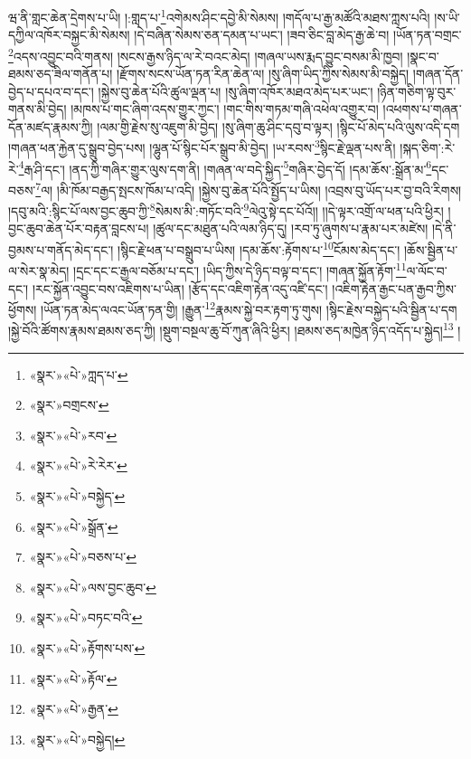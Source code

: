 ཝ་ནི་གླང་ཆེན་དྲེགས་པ་ཡི། །:གླད་པ་\footnote{«སྣར་»«པེ་»ཀླད་པ་}འགེམས་ཤིང་དབྱེ་མི་སེམས། །གདོལ་པ་རྒྱ་མཚོའི་མཐས་ཀླས་པའི། །ས་ཡི་དཀྱིལ་འཁོར་བསྐྱང་མི་སེམས། །དེ་བཞིན་སེམས་ཅན་དམན་པ་ཡང་། །ཟབ་ཅིང་བླ་མེད་རྒྱ་ཆེ་བ། །ཡོན་ཏན་བགྲང་\footnote{«སྣར་»བགྲངས་}འདས་འབྱུང་བའི་གནས། །སངས་རྒྱས་ཉིད་ལ་རེ་བའང་མེད། །གཞལ་ཡས་རྨད་བྱུང་བསམ་མི་ཁྱབ། །སྣང་བ་ཐམས་ཅད་ཟིལ་གནོན་པ། །རྫོགས་སངས་ཡོན་ཏན་རིན་ཆེན་ལ། །སུ་ཞིག་ཡིད་ཀྱིས་སེམས་མི་བསྐྱེད། །གཞན་དོན་བྱེད་པ་དཔའ་བ་དང་། །སྐྱེས་བུ་ཆེན་པོའི་ཚུལ་ལྡན་པ། །སུ་ཞིག་འཁོར་མཐའ་མེད་པར་ཡང་། །ཉིན་གཅིག་ལྟ་བུར་གནས་མི་བྱེད། །མཁས་པ་གང་ཞིག་འདས་གྱུར་ཀྱང་། །གང་གིས་གཏམ་གཞི་འཕེལ་འགྱུར་བ། །འཕགས་པ་གཞན་དོན་མཛད་རྣམས་ཀྱི། །ལམ་གྱི་རྗེས་སུ་འཇུག་མི་བྱེད། །སུ་ཞིག་ཆུ་ཤིང་དབུ་བ་ལྟར། །སྙིང་པོ་མེད་པའི་ལུས་འདི་དག །གཞན་ཕན་རྐྱེན་དུ་སྒྲུབ་བྱེད་པས། །ལྷུན་པོ་སྙིང་པོར་སྒྲུབ་མི་བྱེད། །ཡ་རབས་\footnote{«སྣར་»«པེ་»རབ་}སྙིང་རྗེ་ལྡན་པས་ནི། །སྐད་ཅིག་:རེ་རེ་\footnote{«སྣར་»«པེ་»རེ་རེར་}རྒ་ཤི་དང་། །ནད་ཀྱི་གཞིར་གྱུར་ལུས་དག་ནི། །གཞན་ལ་བདེ་སྐྱིད་\footnote{«སྣར་»«པེ་»བསྐྱེད་}གཞིར་བྱེད་དོ། །དམ་ཆོས་:སྒྲོན་མ་\footnote{«སྣར་»«པེ་»སྒྲོན་}དང་བཅས་\footnote{«སྣར་»«པེ་»བཅས་པ་}ལ། །མི་ཁོམ་བརྒྱད་སྤངས་ཁོམ་པ་འདི། །སྐྱེས་བུ་ཆེན་པོའི་སྤྱོད་པ་ཡིས། །འབྲས་བུ་ཡོད་པར་བྱ་བའི་རིགས། །དབུ་མའི་:སྙིང་པོ་ལས་བྱང་ཆུབ་ཀྱི་\footnote{«སྣར་»«པེ་»ལས་བྱང་ཆུབ་}སེམས་མི་:གཏོང་བའི་\footnote{«སྣར་»«པེ་»བཏང་བའི་}ལེའུ་སྟེ་དང་པོའོ།། །།དེ་ལྟར་འགྲོ་ལ་ཕན་པའི་ཕྱིར། །བྱང་ཆུབ་ཆེན་པོར་བརྟན་བླངས་པ། །ཚུལ་དང་མཐུན་པའི་ལམ་ཉིད་དུ། །རབ་ཏུ་ཞུགས་པ་རྣམ་པར་མཛེས། །དེ་ནི་བྱམས་པ་གནོད་མེད་དང་། །སྙིང་རྗེ་ཕན་པ་བསྒྲུབ་པ་ཡིས། །དམ་ཆོས་:རྟོགས་པ་\footnote{«སྣར་»«པེ་»རྟོགས་པས་}ངོམས་མེད་དང་། །ཆོས་སྦྱིན་པ་ལ་སེར་སྣ་མེད། །དྲང་དང་ང་རྒྱལ་བཅོམ་པ་དང་། །ཡིད་ཀྱིས་དེ་ཉིད་བལྟ་བ་དང་། །གཞན་སྐྱོན་རྟོག་\footnote{«སྣར་»«པེ་»རྟོལ་}ལ་ལོང་བ་དང་། །རང་སྐྱོན་འབྱུང་བས་འཇིགས་པ་ཡིན། །རྩོད་དང་འཇིག་རྟེན་འདུ་འཛི་དང་། །འཇིག་རྟེན་རྒྱང་པན་རྒྱབ་ཀྱིས་ཕྱོགས། །ཡོན་ཏན་མེད་ལའང་ཡོན་ཏན་གྱི། །རྒྱུན་\footnote{«སྣར་»«པེ་»རྒྱན་}རྣམས་སྐྱེ་བར་རྟག་ཏུ་གུས། །སྙིང་རྗེས་བསྐྱེད་པའི་སྦྱིན་པ་དག །སྐྱེ་བོའི་ཚོགས་རྣམས་ཐམས་ཅད་ཀྱི། །སྡུག་བསྔལ་ཆུ་བོ་ཀུན་ཞིའི་ཕྱིར། །ཐམས་ཅད་མཁྱེན་ཉིད་འདོད་པ་སྐྱེད།\footnote{«སྣར་»«པེ་»བསྐྱེད།} །
